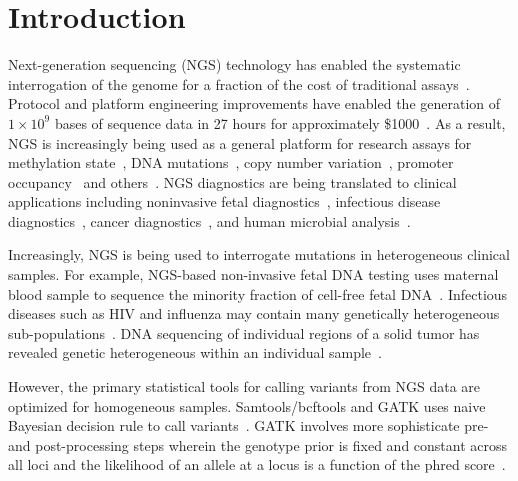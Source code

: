 \documentclass{bioinfo}
\begin{document}
\section{Introduction}
\label{sec:intro}
Next-generation sequencing (NGS) technology has enabled the systematic interrogation of the genome for a fraction of the cost of traditional assays~\citep{Koboldt:2013kw}. Protocol and platform engineering improvements have enabled the generation of $1\times10^9$ bases of sequence data in 27 hours for approximately \$1000~\citep{Quail:2012hf}. As a result, NGS is increasingly being used as a general platform for research assays for methylation state~\citep{Laird:2010ab}, DNA mutations~\citep{Consortium:2013co}, copy number variation~\citep{Alkan:2009cr}, promoter occupancy~\citep{Ouyang:2009hc} and others~\citep{Rivera:2013ee}. NGS diagnostics are being translated to clinical applications including noninvasive fetal diagnostics~\citep{Kitzman:2012hea}, infectious disease diagnostics~\citep{Capobianchi:2012em}, cancer diagnostics~\citep{Navin:2010gu}, and human microbial analysis~\citep{Consortium:2013iz}.

Increasingly, NGS is being used to interrogate mutations in heterogeneous clinical samples. For example, NGS-based non-invasive fetal DNA testing uses maternal blood sample to sequence the minority fraction of cell-free fetal DNA~\citep{Fan:2008di}. Infectious diseases such as HIV and influenza may contain many genetically heterogeneous sub-populations~\citep{Flaherty:2011ja, Ghedin:2010ie}. DNA sequencing of individual regions of a solid tumor has revealed genetic heterogeneous within an individual sample~\citep{Navin:2010gu}.

However, the primary statistical tools for calling variants from NGS data are optimized for homogeneous samples.  Samtools/bcftools and GATK uses naive Bayesian decision rule to call variants~\citep{li2011statistical, depristo2011framework}. GATK involves more sophisticate pre- and post-processing steps wherein the genotype prior is fixed and constant across all loci and the likelihood of an allele at a locus is a function of the phred score~\citep{McKenna:2010bv}.
\end{document}
